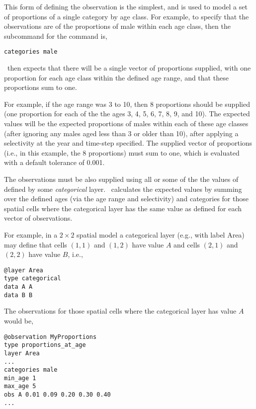 This form of defining the observation is the simplest, and is used to model a set of proportions of a single category by age class. For example, to specify that the observations are of the proportions of male within each age class, then the subcommand  for the  command is,

{\small{\begin{verbatim}
categories male
\end{verbatim}}}

\SPM\ then expects that there will be a single vector of proportions supplied, with one proportion for each age class within the defined age range, and that these proportions sum to one. 

For example, if the age range was 3 to 10, then 8 proportions should be supplied (one proportion for each of the the ages 3, 4, 5, 6, 7, 8, 9, and 10). The expected values will be the expected proportions of males within each of these age classes (after ignoring any males aged less than 3 or older than 10), after applying a selectivity at the year and time-step specified. The supplied vector of proportions (i.e., in this example, the 8 proportions) must sum to one, which is evaluated with a default tolerance of 0.001. 

The observations must be also supplied using all or some of the the values of defined by some \emph{categorical} layer. \SPM\ calculates the expected values by summing over the defined ages (via the age range and selectivity) and categories for those spatial cells where the categorical layer has the same value as defined for each vector of observations.

For example, in a $2 \times 2$ spatial model a categorical layer (e.g., with label Area) may define that cells $(1,1)$ and $(1,2)$ have value $A$ and cells $(2,1)$ and $(2,2)$ have value $B$, i.e.,

{\small{\begin{verbatim}
@layer Area
type categorical
data A A 
data B B
\end{verbatim}}}

The observations for those spatial cells where the categorical layer has value $A$ would be, 

{\small{\begin{verbatim}
@observation MyProportions
type proportions_at_age
layer Area
...
categories male
min_age 1
max_age 5
obs A 0.01 0.09 0.20 0.30 0.40
...
\end{verbatim}}}

